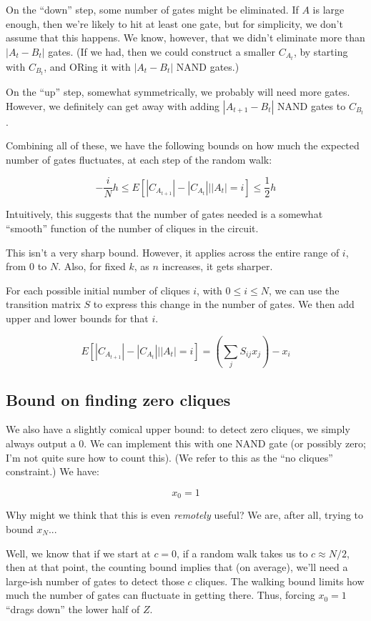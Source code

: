 \documentclass[12pt]{article}
\theoremstyle{definition}
\begin{document}
On the ``down'' step, some number of gates might be eliminated.
If $A$ is large enough, then we're likely to hit at least one gate,
but for simplicity, we don't assume that this happens.
We know, however, that we didn't eliminate more than $|A_t - B_t|$
gates. (If we had, then we could construct a smaller $C_{A_t}$,
by starting with $C_{B_t}$, and ORing it with $|A_t - B_t|$
NAND gates.)

On the ``up'' step, somewhat symmetrically, we probably will
need more gates. However, we definitely can get away with
adding $|A_{t+1} - B_t|$ NAND gates to $C_{B_t}$.

Combining all of these, we have the following bounds on how much the
expected number of gates fluctuates, at each step of the random walk:

\[
-\frac{i}{N}h \le E[ |C_{A_{t+1}}| - |C_{A_t}| | |A_t|=i ] \le \frac{1}{2}h
\]

Intuitively, this suggests that the number
of gates needed is a somewhat ``smooth'' function of the
number of cliques in the circuit.

This isn't a very sharp bound. However, it applies across the entire
range of $i$, from 0 to $N$. Also, for fixed $k$, as $n$ increases,
it gets sharper.

For each possible initial number of cliques $i$, with $0 \le i \le N$,
we can use the transition matrix $S$ to express this change in the
number of gates. We then add upper and lower bounds for that $i$.

\[
E[ |C_{A_{t+1}}| - |C_{A_t}| | |A_t|=i ] = (\sum_j S_{ij} x_j) - x_i
\]

\subsection{Bound on finding zero cliques}

We also have a slightly comical upper bound:
to detect zero cliques, we simply always
output a 0. We can implement this with one NAND gate (or possibly zero;
I'm not quite sure how to count this). (We refer to this as the
``no cliques'' constraint.) We have:

\[
x_0 = 1
\]

Why might we think that this is even {\em remotely} useful? We are, after
all, trying to bound $x_N$...

Well, we know that if we start at $c=0$, if a random walk takes us to
$c \approx N/2$, then at that point, the counting bound implies that
(on average), we'll need a large-ish number of gates to detect those $c$ cliques.
The walking bound limits how much the number of gates can fluctuate
in getting there. Thus, forcing $x_0=1$ ``drags down'' the lower half of $Z$.
\end{document}
